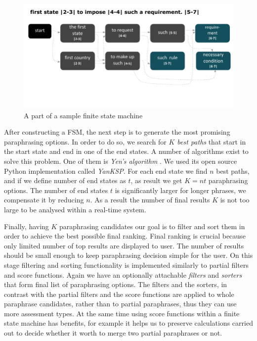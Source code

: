 \begin{figure}
 \centering 
 \includegraphics{g/fsm.pdf}
 \caption{A part of a sample finite state machine}
\end{figure}

After constructing a FSM, the next step is to generate the most promising paraphrasing options. In order to do so, we search for \emph{$K$ best paths} that start in the start state and end in one of the end states. A number of algorithms exist to solve this problem. One of them is \emph{Yen's algorithm} \citep{yen1971finding}. We used its open source Python implementation called \emph{YanKSP}. For each end state we find $n$ best paths, and if we define number of end states as $t$, as result we get $K = nt$ paraphrasing options. The number of end states $t$ is significantly larger for longer phrases, we compensate it by reducing $n$. As a result the number of final results $K$ is not too large to be analysed within a real-time system.

Finally, having $K$ paraphrasing candidates our goal is to filter and sort them in order to achieve the best possible final ranking. Final ranking is crucial because only limited number of top results are displayed to user. The number of results should be small enough to keep paraphrasing decision simple for the user. On this stage filtering and sorting functionality is implemented similarly to partial filters and score functions. Again we have an optionally attachable \emph{filters} and \emph{sorters} that form final list of paraphrasing options. The filters and the sorters, in contrast with the partial filters and the score functions are applied to whole paraphrase candidates, rather than to partial paraphrases, thus they can use more assessment types. At the same time using score functions within a finite state machine has benefits, for example it helps us to preserve calculations carried out to decide whether it worth to merge two partial paraphrases or not. 


